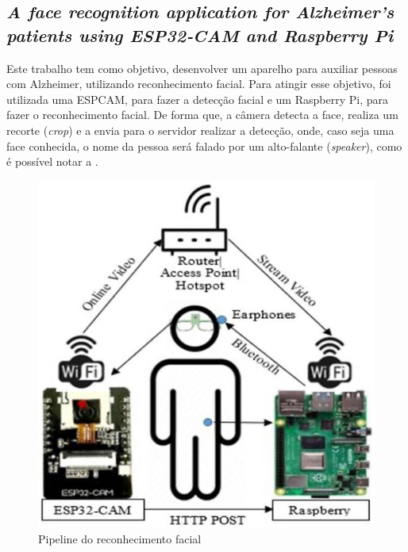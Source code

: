 \subsection{\textit{A face recognition application for Alzheimer’s patients using ESP32‑CAM and Raspberry Pi}}
Este trabalho \cite{espcamAlzheimer} tem como objetivo, desenvolver um aparelho para auxiliar pessoas com Alzheimer,
utilizando reconhecimento facial. Para atingir esse objetivo, foi utilizada uma ESPCAM, para fazer a detecção facial
e um Raspberry Pi, para fazer o reconhecimento facial. De forma que, a câmera detecta a face, realiza um recorte
(\textit{crop}) e a envia para o servidor realizar a detecção, onde, caso seja uma face conhecida, o nome da pessoa será
falado por um alto-falante (\textit{speaker}), como é possível notar a .

\begin{figure}[htb]
	\caption {\label{pipeline_espcam}Pipeline do reconhecimento facial}
	\begin{center}
		\includegraphics[scale=0.15]{Imagens/pipiline-espcam-alzheimer}
	\end{center}
\end{figure}
